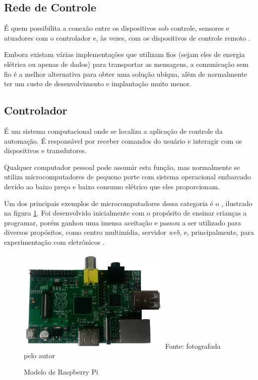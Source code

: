 \subsection{Rede de Controle}
É quem possibilita a conexão entre os dispositivos sob controle, sensores e atuadores com o controlador e, às
vezes, com os dispositivos de controle remoto \cite{kyas2013}.

Embora existam várias implementações que utilizam fios (sejam eles de energia elétrica ou apenas de dados)
para transportar as mensagens, a comunicação sem fio é a melhor alternativa para obter uma solução ubíqua,
além de normalmente ter um custo de desenvolvimento e implantação muito menor.

\subsection{Controlador}
É um sistema computacional onde se localiza a aplicação de controle da automação. É responsável por receber comandos do
usuário e interagir com os dispositivos e transdutores.

Qualquer computador pessoal pode assumir esta função, mas normalmente se utiliza microcomputadores de pequeno porte com sistema
operacional embarcado devido ao baixo preço e baixo consumo elétrico que eles proporcionam.

Um dos principais exemplos de microcomputadores dessa categoria é o , ilustrado na figura
\ref{figura:pi}. Foi desenvolvido inicialmente com o propósito de ensinar crianças a programar, porém ganhou uma
imensa aceitação e passou a ser utilizado para diversos propósitos, como centro multimídia, servidor
\textit{web}, e, principalmente, para experimentação com eletrônicos \cite{schmidt2014}.

\begin{figure}[h]
	\centering
	\caption{Modelo de Raspberry Pi}
	\includegraphics[width=280]{../images/raspberry.png}
	\hspace{\linewidth}
	Fonte: fotografada pelo autor
	\label{figura:pi}
\end{figure}

